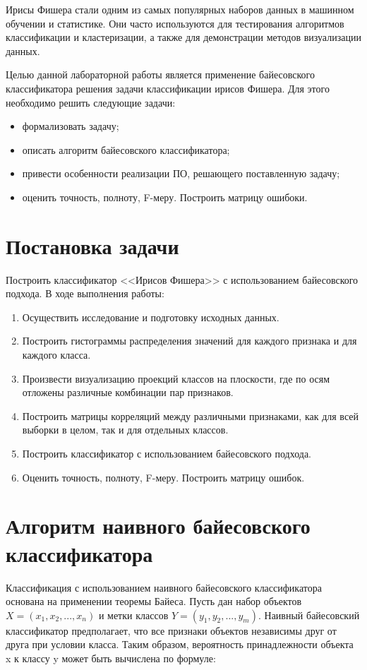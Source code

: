 \documentclass[12pt]{report}
\begin{document}
Ирисы Фишера стали одним из самых популярных наборов данных в машинном обучении и статистике. Они часто используются для тестирования алгоритмов классификации и кластеризации, а также для демонстрации методов визуализации данных.

Целью данной лабораторной работы является применение байесовского классификатора решения задачи классификации ирисов Фишера.
Для этого необходимо решить следующие задачи:
\begin{itemize}
    \item формализовать задачу;
    \item описать алгоритм байесовского классификатора;
    \item привести особенности реализации ПО, решающего поставленную задачу;
    \item оценить точность, полноту, F-меру. Построить матрицу ошибоки.
\end{itemize}

\section{Постановка задачи}

Построить классификатор <<Ирисов Фишера>> с использованием байесовского подхода.
В ходе выполнения работы:
\begin{enumerate}
    \item Осуществить исследование и подготовку исходных данных.
    \item Построить гистограммы распределения значений для каждого признака и для каждого класса.
    \item Произвести визуализацию проекций классов на плоскости, где по осям  отложены различные комбинации пар признаков.
    \item Построить матрицы корреляций между различными признаками, как для всей выборки в целом, так и для отдельных классов.
    \item Построить классификатор с использованием байесовского подхода.
    \item Оценить точность, полноту, F-меру. Построить матрицу ошибок.
\end{enumerate}

\section{Алгоритм наивного байесовского классификатора}
Классификация с использованием наивного байесовского классификатора основана на применении теоремы Байеса. Пусть дан набор объектов $X = (x_1, x_2, ..., x_n)$ и метки классов $Y = (y_1, y_2, ..., y_m)$. Наивный байесовский классификатор предполагает, что все признаки объектов независимы друг от друга при условии класса. Таким образом, вероятность принадлежности объекта x к классу y может быть вычислена по формуле:
\end{document}

